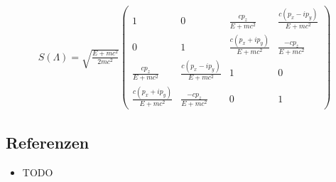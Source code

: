 \begin{align}
  \label{eq:42}
\boxed{
  S(\Lambda)=\sqrt{\frac{E + mc^2}{2mc^2}}
  \begin{pmatrix}
    1&0&\frac{cp_z}{E+mc^2}&\frac{c(p_x-ip_y)}{E+mc^2}\\
    0&1&\frac{c(p_x+ip_y)}{E+mc^2}&\frac{-cp_z}{E+mc^2}\\
    \frac{cp_z}{E+mc^2}&\frac{c(p_x-ip_y)}{E+mc^2}&1&0\\
    \frac{c(p_x+ip_y)}{E+mc^2}&\frac{-cp_z}{E+mc^2}&0&1
  \end{pmatrix}}
\end{align}
\subsection*{Referenzen}
\begin{itemize}
\item TODO
\end{itemize}
  

